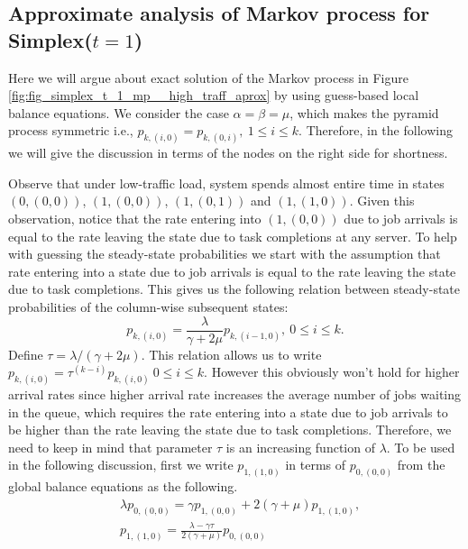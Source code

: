\documentclass[sigconf,draft]{acmart}
\begin{document}
\subsection{Approximate analysis of Markov process for Simplex($t=1$)}
\label{subsec:subsec_simplex_t_1_pyramid_mp_analysis}
Here we will argue about exact solution of the Markov process in Figure \ref{fig:fig_simplex_t_1_mp__high_traff_aprox} by using guess-based local balance equations. We consider the case $\alpha = \beta = \mu$, which makes the pyramid process symmetric i.e., $p_{k,(i,0)} = p_{k,(0,i)},~1 \leq i \leq k$. Therefore, in the following we will give the discussion in terms of the nodes on the right side for shortness.

Observe that under low-traffic load, system spends almost entire time in states $(0,(0,0))$, $(1,(0,0))$, $(1,(0,1))$ and $(1,(1,0))$. Given this observation, notice that the rate entering into $(1,(0,0))$ due to job arrivals is equal to the rate leaving the state due to task completions at any server. To help with guessing the steady-state probabilities we start with the assumption that rate entering into a state due to job arrivals is equal to the rate leaving the state due to task completions. This gives us the following relation between steady-state probabilities of the column-wise subsequent states:
\begin{equation}
  \label{eq:eq_geometric_over_column}
  p_{k,(i,0)} = \frac{\lambda}{\gamma+2\mu}p_{k,(i-1,0)},~0 \leq i \leq k.
\end{equation}
Define $\tau = \lambda/(\gamma+2\mu)$. This relation allows us to write $p_{k,(i,0)} = \tau^(k-i)p_{k,(i,0)}~0 \leq i \leq k$. However this obviously won't hold for higher arrival rates since higher arrival rate increases the average number of jobs waiting in the queue, which requires the rate entering into a state due to job arrivals to be higher than the rate leaving the state due to task completions. Therefore, we need to keep in mind that parameter $\tau$ is an increasing function of $\lambda$. To be used in the following discussion, first we write $p_{1,(1,0)}$ in terms of $p_{0,(0,0)}$ from the global balance equations as the following.
\begin{equation}
  \label{eq:eq_p_0_global_balance}
  \begin{split}
    & \lambda p_{0,(0,0)} = \gamma p_{1,(0,0)} + 2(\gamma+\mu)p_{1,(1,0)}, \\
    & p_{1,(1,0)} = \frac{\lambda-\gamma\tau}{2(\gamma+\mu)}p_{0,(0,0)}
  \end{split}
\end{equation}
\end{document}
